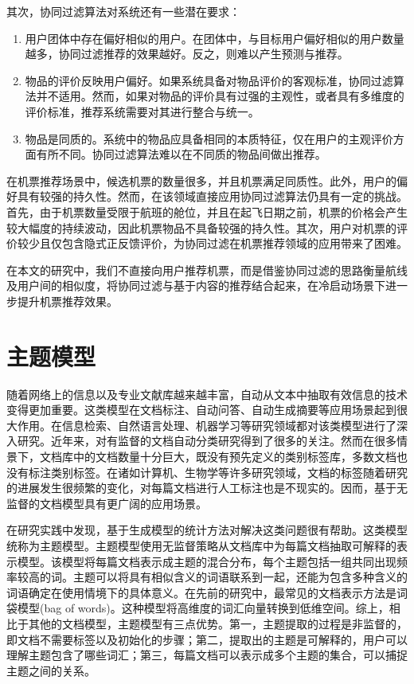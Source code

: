 其次，协同过滤算法对系统还有一些潜在要求：

\begin{enumerate}
	\item 用户团体中存在偏好相似的用户。在团体中，与目标用户偏好相似的用户数量越多，协同过滤推荐的效果越好。反之，则难以产生预测与推荐。
	\item 物品的评价反映用户偏好。如果系统具备对物品评价的客观标准，协同过滤算法并不适用。然而，如果对物品的评价具有过强的主观性，或者具有多维度的评价标准，推荐系统需要对其进行整合与统一。
	\item 物品是同质的。系统中的物品应具备相同的本质特征，仅在用户的主观评价方面有所不同。协同过滤算法难以在不同质的物品间做出推荐。
\end{enumerate}

在机票推荐场景中，候选机票的数量很多，并且机票满足同质性。此外，用户的偏好具有较强的持久性。然而，在该领域直接应用协同过滤算法仍具有一定的挑战。首先，由于机票数量受限于航班的舱位，并且在起飞日期之前，机票的价格会产生较大幅度的持续波动，因此机票物品不具备较强的持久性。其次，用户对机票的评价较少且仅包含隐式正反馈评价，为协同过滤在机票推荐领域的应用带来了困难。

在本文的研究中，我们不直接向用户推荐机票，而是借鉴协同过滤的思路衡量航线及用户间的相似度，将协同过滤与基于内容的推荐结合起来，在冷启动场景下进一步提升机票推荐效果。

\section{主题模型}

随着网络上的信息以及专业文献库越来越丰富，自动从文本中抽取有效信息的技术变得更加重要。这类模型在文档标注、自动问答、自动生成摘要等应用场景起到很大作用。在信息检索、自然语言处理、机器学习等研究领域都对该类模型进行了深入研究。近年来，对有监督的文档自动分类研究得到了很多的关注\cite{yang1999evaluation}。然而在很多情景下，文档库中的文档数量十分巨大，既没有预先定义的类别标签库，多数文档也没有标注类别标签。在诸如计算机、生物学等许多研究领域，文档的标签随着研究的进展发生很频繁的变化，对每篇文档进行人工标注也是不现实的。因而，基于无监督的文档模型具有更广阔的应用场景。

在研究实践中发现，基于生成模型\cite{zhong2005generative,hofmann1999probabilistic,blei2003latent,minka2002expectation}的统计方法对解决这类问题很有帮助。这类模型统称为主题模型。主题模型使用无监督策略从文档库中为每篇文档抽取可解释的表示模型。该模型将每篇文档表示成主题的混合分布，每个主题包括一组共同出现频率较高的词。主题可以将具有相似含义的词语联系到一起，还能为包含多种含义的词语确定在使用情境下的具体意义。在先前的研究中，最常见的文档表示方法是词袋模型(bag of words)\cite{zhang2010understanding}。这种模型将高维度的词汇向量转换到低维空间。综上，相比于其他的文档模型，主题模型有三点优势。第一，主题提取的过程是非监督的，即文档不需要标签以及初始化的步骤；第二，提取出的主题是可解释的，用户可以理解主题包含了哪些词汇；第三，每篇文档可以表示成多个主题的集合，可以捕捉主题之间的关系。


